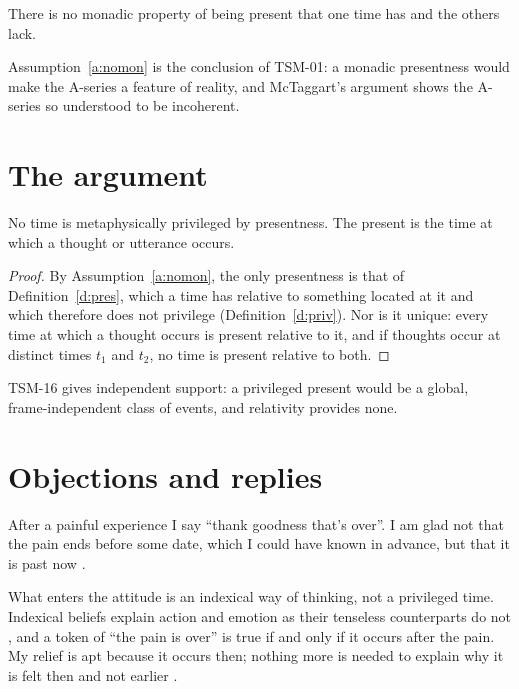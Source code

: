 \documentclass{situationist-preprint}
\begin{document}
\begin{assumption}\label{a:nomon}
There is no monadic property of being present that one time has and the others lack.
\end{assumption}

Assumption~\ref{a:nomon} is the conclusion of TSM-01: a monadic presentness would make the A-series a feature of reality, and McTaggart's argument shows the A-series so understood to be incoherent.

\section{The argument}

\begin{theorem}\label{t:main}
No time is metaphysically privileged by presentness. The present is the time at which a thought or utterance occurs.
\end{theorem}

\begin{proof}
By Assumption~\ref{a:nomon}, the only presentness is that of Definition~\ref{d:pres}, which a time has relative to something located at it and which therefore does not privilege (Definition~\ref{d:priv}). Nor is it unique: every time at which a thought occurs is present relative to it, and if thoughts occur at distinct times $t_1$ and $t_2$, no time is present relative to both.
\end{proof}

TSM-16 gives independent support: a privileged present would be a global, frame-independent class of events, and relativity provides none.

\section{Objections and replies}

\begin{objection}[Relief]\label{o:relief}
After a painful experience I say \enquote{thank goodness that's over}. I am glad not that the pain ends before some date, which I could have known in advance, but that it is past now \citep{Prior1959}.
\end{objection}

\begin{reply}
What enters the attitude is an indexical way of thinking, not a privileged time. Indexical beliefs explain action and emotion as their tenseless counterparts do not \citep{Perry1979}, and a token of \enquote{the pain is over} is true if and only if it occurs after the pain. My relief is apt because it occurs then; nothing more is needed to explain why it is felt then and not earlier \citep{Mellor1998}.
\end{reply}
\end{document}
